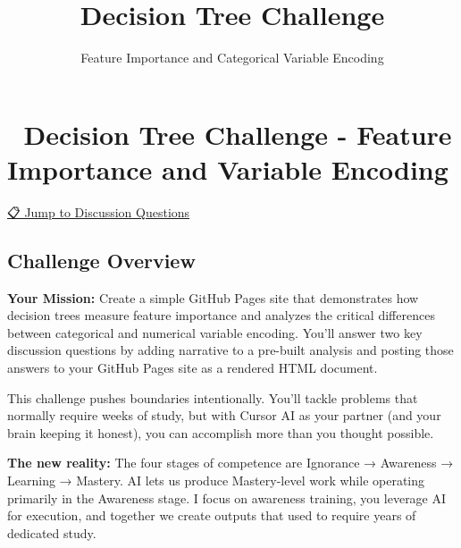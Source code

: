 \documentclass[
  letterpaper,
  DIV=11,
  numbers=noendperiod]{scrartcl}
\title{Decision Tree Challenge}
\subtitle{Feature Importance and Categorical Variable Encoding}
\author{}
\date{}
\begin{document}
\maketitle


\section{🌳 Decision Tree Challenge - Feature Importance and Variable
Encoding}\label{decision-tree-challenge---feature-importance-and-variable-encoding}

\hyperref[discussion-questions-for-challenge]{📋 Jump to Discussion
Questions}

\subsection{Challenge Overview}\label{challenge-overview}

\textbf{Your Mission:} Create a simple GitHub Pages site that
demonstrates how decision trees measure feature importance and analyzes
the critical differences between categorical and numerical variable
encoding. You'll answer two key discussion questions by adding narrative
to a pre-built analysis and posting those answers to your GitHub Pages
site as a rendered HTML document.

\begin{tcolorbox}[enhanced jigsaw, bottomtitle=1mm, coltitle=black, rightrule=.15mm, colbacktitle=quarto-callout-warning-color!10!white, opacityback=0, colback=white, toptitle=1mm, title=\textcolor{quarto-callout-warning-color}{\faExclamationTriangle}\hspace{0.5em}{⚠️ AI Partnership Required}, titlerule=0mm, left=2mm, arc=.35mm, colframe=quarto-callout-warning-color-frame, leftrule=.75mm, bottomrule=.15mm, toprule=.15mm, opacitybacktitle=0.6, breakable]

This challenge pushes boundaries intentionally. You'll tackle problems
that normally require weeks of study, but with Cursor AI as your partner
(and your brain keeping it honest), you can accomplish more than you
thought possible.

\textbf{The new reality:} The four stages of competence are Ignorance →
Awareness → Learning → Mastery. AI lets us produce Mastery-level work
while operating primarily in the Awareness stage. I focus on awareness
training, you leverage AI for execution, and together we create outputs
that used to require years of dedicated study.

\end{tcolorbox}
\end{document}
